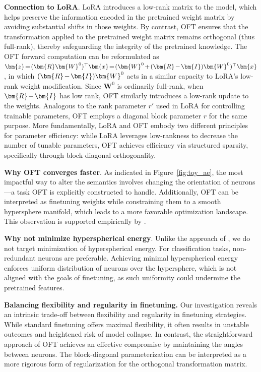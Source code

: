 \textbf{Connection to LoRA}. LoRA introduces a low-rank matrix to the model, which helps preserve the information encoded in the pretrained weight matrix by avoiding substantial shifts in those weights. By contrast, OFT ensures that the transformation applied to the pretrained weight matrix remains orthogonal (thus full-rank), thereby safeguarding the integrity of the pretrained knowledge. The OFT forward computation can be reformulated as $\thickmuskip=2mu \medmuskip=2mu \bm{z}=(\bm{R}\bm{W}^0)^\top\bm{x}=(\bm{W}^0+(\bm{R}-\bm{I})\bm{W}^0)^\top\bm{x}$, in which $\thickmuskip=2mu \medmuskip=2mu (\bm{R}-\bm{I})\bm{W}^0$ acts in a similar capacity to LoRA’s low-rank weight modification. Since $\bm{W}^0$ is ordinarily full-rank, when $\thickmuskip=2mu \medmuskip=2mu \bm{R}-\bm{I}$ has low rank, OFT similarly introduces a low-rank update to the weights. Analogous to the rank parameter $r'$ used in LoRA for controlling trainable parameters, OFT employs a diagonal block parameter $r$ for the same purpose. More fundamentally, LoRA and OFT embody two different principles for parameter efficiency: while LoRA leverages low-rankness to decrease the number of tunable parameters, OFT achieves efficiency via structured sparsity, specifically through block-diagonal orthogonality.

\textbf{Why OFT converges faster}. As indicated in Figure~\ref{fig:toy_ae}, the most impactful way to alter the semantics involves changing the orientation of neurons—a task OFT is explicitly constructed to handle. Additionally, OFT can be interpreted as finetuning weights while constraining them to a smooth hypersphere manifold, which leads to a more favorable optimization landscape. This observation is supported empirically by \cite{liu2021orthogonal}.

\textbf{Why not minimize hyperspherical energy}. Unlike the approach of \cite{liu2021orthogonal}, we do not target minimization of hyperspherical energy. For classification tasks, non-redundant neurons are preferable. Achieving minimal hyperspherical energy enforces uniform distribution of neurons over the hypersphere, which is not aligned with the goals of finetuning, as such uniformity could undermine the pretrained features.

\textbf{Balancing flexibility and regularity in finetuning.} Our investigation reveals an intrinsic trade-off between flexibility and regularity in finetuning strategies. While standard finetuning offers maximal flexibility, it often results in unstable outcomes and heightened risk of model collapse. In contrast, the straightforward approach of OFT achieves an effective compromise by maintaining the angles between neurons. The block-diagonal parameterization can be interpreted as a more rigorous form of regularization for the orthogonal transformation matrix.

